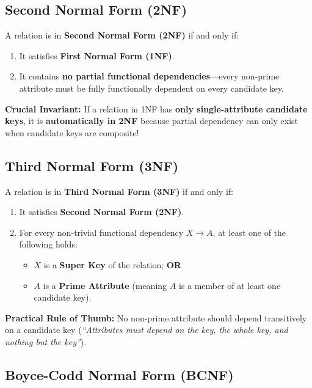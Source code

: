 \subsection{Second Normal Form (2NF)}

\begin{tcolorbox}[colback=white,colframe=black,title=\textbf{2NF Definition}]
A relation is in \textbf{Second Normal Form (2NF)} if and only if:
\begin{enumerate}
\item It satisfies \textbf{First Normal Form (1NF)}.
\item It contains \textbf{no partial functional dependencies}—every non-prime attribute must be fully functionally dependent on every candidate key.
\end{enumerate}
\end{tcolorbox}
\textbf{Crucial Invariant:} If a relation in 1NF has \textbf{only single-attribute candidate keys}, it is \textbf{automatically in 2NF} because partial dependency can only exist when candidate keys are composite!

\subsection{Third Normal Form (3NF)}

\begin{tcolorbox}[colback=white,colframe=black,title=\textbf{3NF Definition (Formal and Practical)}]
A relation is in \textbf{Third Normal Form (3NF)} if and only if:
\begin{enumerate}
\item It satisfies \textbf{Second Normal Form (2NF)}.
\item For every non-trivial functional dependency $X \rightarrow A$, at least one of the following holds:
\begin{itemize}
\item $X$ is a \textbf{Super Key} of the relation; \textbf{OR}
\item $A$ is a \textbf{Prime Attribute} (meaning $A$ is a member of at least one candidate key).
\end{itemize}
\end{enumerate}
\end{tcolorbox}
\textbf{Practical Rule of Thumb:} No non-prime attribute should depend transitively on a candidate key (\textit{``Attributes must depend on the key, the whole key, and nothing but the key''}).

\subsection{Boyce-Codd Normal Form (BCNF)}

